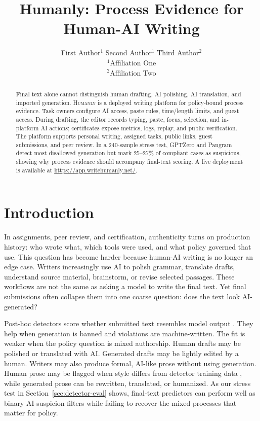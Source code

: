 \documentclass[11pt]{article}
\title{Humanly: Process Evidence for Human-AI Writing}
\author{
  First Author$^{1}$ \quad
  Second Author$^{1}$ \quad
  Third Author$^{2}$ \\
  {\normalfont $^{1}$Affiliation One} \\
  {\normalfont $^{2}$Affiliation Two}
}
\begin{document}
\maketitle

\begin{abstract}
Final text alone cannot distinguish human drafting, AI polishing, AI translation, and imported generation. \textsc{Humanly} is a deployed writing platform for policy-bound process evidence. Task owners configure AI access, paste rules, time/length limits, and guest access. During drafting, the editor records typing, paste, focus, selection, and in-platform AI actions; certificates expose metrics, logs, replay, and public verification. The platform supports personal writing, assigned tasks, public links, guest submissions, and peer review. In a 240-sample stress test, GPTZero and Pangram detect most disallowed generation but mark 25--27\% of compliant cases as suspicious, showing why process evidence should accompany final-text scoring. A live deployment is available at \url{https://app.writehumanly.net/}.
\end{abstract}

\section{Introduction}
\label{sec:intro}

In assignments, peer review, and certification, authenticity turns on production history: who wrote what, which tools were used, and what policy governed that use. This question has become harder because human-AI writing is no longer an edge case. Writers increasingly use AI to polish grammar, translate drafts, understand source material, brainstorm, or revise selected passages. These workflows are not the same as asking a model to write the final text. Yet final submissions often collapse them into one coarse question: does the text look AI-generated?

Post-hoc detectors score whether submitted text resembles model output \citep{mitchell2023detectgpt, hans2024binoculars, verma2024ghostbuster}. They help when generation is banned and violations are machine-written. The fit is weaker when the policy question is mixed authorship. Human drafts may be polished or translated with AI. Generated drafts may be lightly edited by a human. Writers may also produce formal, AI-like prose without using generation. Human prose may be flagged when style differs from detector training data \citep{liang2023gpt}, while generated prose can be rewritten, translated, or humanized. As our stress test in Section~\ref{sec:detector-eval} shows, final-text predictors can perform well as binary AI-suspicion filters while failing to recover the mixed processes that matter for policy.
\end{document}
